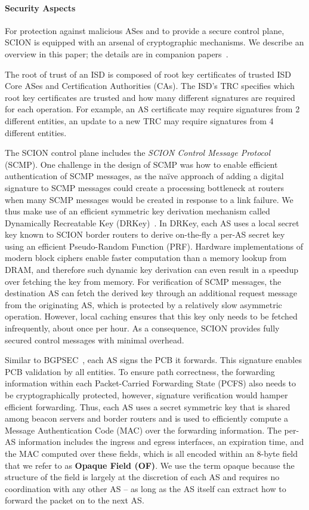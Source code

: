 \documentclass[a4paper]{llncs}
\newcommand\SCION{{\small\textsf{SCION}}\xspace}
\begin{document}
\paragraph{Security Aspects}
For protection against malicious ASes and to provide a secure control plane, 
\SCION is equipped
with an arsenal of cryptographic mechanisms. We describe an overview in this
paper; the details are in companion papers~\cite{ZhHsHaChPeAn2011,MRSKP2015}. 

The root of
trust of an ISD is composed of root key certificates of trusted ISD Core ASes and
Certification Authorities (CAs). The ISD's TRC specifies which root key
certificates are trusted and how many different signatures are required for each
operation. For example, an AS certificate may require signatures from 2 different
entities, an update to a new TRC may require signatures from 4 different
entities.

The \SCION control plane includes the \emph{\SCION Control Message Protocol} (SCMP).
One challenge in the design of SCMP was how to enable efficient authentication of SCMP messages,
as the na{\"i}ve approach of adding a digital signature to SCMP messages
could create a processing bottleneck at routers when many SCMP messages would be created in
response to a link failure.  We thus make use of an efficient symmetric key
derivation mechanism called Dynamically Recreatable Key
(DRKey)~\cite{KBJLHP2014}. In DRKey, each AS uses a local secret key known to
\SCION border routers to derive on-the-fly a per-AS secret key using an
efficient Pseudo-Random Function (PRF).  Hardware implementations of modern
block ciphers enable faster computation than a memory lookup from DRAM, and
therefore
such dynamic key derivation can even result in a speedup over fetching the key
from memory. For verification of SCMP messages, the destination AS can fetch the
derived key through an additional request message from the originating AS, which is protected by a
relatively slow asymmetric operation. However, local caching ensures that this
key only needs to be fetched infrequently, about once per hour. As a
consequence, \SCION provides fully secured control messages with minimal
overhead.

Similar to BGPSEC~\cite{LepTur2013}, each AS signs the PCB it forwards. This
signature enables PCB validation by all entities. To ensure path correctness,
the forwarding information within each Packet-Carried Forwarding State (PCFS) also needs to be cryptographically
protected, however, signature verification would hamper efficient forwarding.
Thus, each AS uses a secret symmetric key that is shared among beacon
servers and border routers and is used to efficiently compute a Message
Authentication Code (MAC) over the forwarding information. The per-AS
information includes the ingress and egress interfaces, an expiration
time, and the MAC computed over these fields, which is all encoded within an
8-byte field that we refer to as \textbf{Opaque Field (OF)}.  We use the term opaque because the structure of the
field is largely at the discretion of each AS and requires no
coordination with any other AS -- as long as the AS itself can extract how to
forward the packet on to the next AS.
\end{document}
